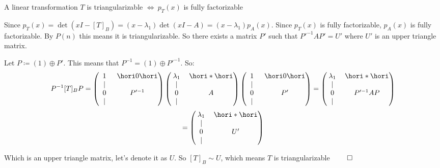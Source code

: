 \documentclass[10pt]{article}
\begin{document}
\begin{theorem*}{A linear transformation $T$ is triangularizable $\iff ~ p_T(x)$ is fully factorizable}
\begin{minipage}[t]{\dimexpr\textwidth-2cm}
Since $p_T(x) = \det(xI-[T]_B)=(x-\lambda_1)\det(xI-A)=(x-\lambda_1)p_A(x)$. Since $p_T(x)$ is fully factorizable, $p_A(x)$ is fully factorizable. By $P(n)$ this means it is triangularizable. So there exists a matrix $P'$ such that $P'^{-1}AP'=U'$ where $U'$ is an upper triangle matrix.

Let $P\coloneqq(1)\oplus P'$. This means that $P^{-1}=(1)\oplus P'^{-1}$. So:
\[ P^{-1}[T]_B P = \begin{pmatrix} 1 & \hori0\hori \\ \begin{array}{c}\vert\\0\\\vert\end{array} & P'^{-1} \end{pmatrix} \begin{pmatrix} \lambda_1 & \hori*\hori \\ \begin{array}{c} \vert\\0\\\vert\end{array} & A\end{pmatrix} \begin{pmatrix} 1 & \hori0\hori \\ \begin{array}{c}\vert\\0\\\vert\end{array} & P' \end{pmatrix} = \begin{pmatrix} \lambda_1 & \hori*\hori \\ \begin{array}{c}\vert\\0\\\vert\end{array} & P'^{-1}AP \end{pmatrix}\]
\[ = \begin{pmatrix} \lambda_1 & \hori*\hori \\ \begin{array}{c}\vert\\0\\\vert\end{array} & U' \end{pmatrix} \]

Which is an upper triangle matrix, let's denote it as $U$. So $[T]_B\sim U$, which means $T$ is triangularizable $\qed$

\end{minipage}

\end{theorem*}
\end{document}
